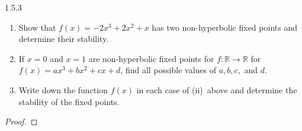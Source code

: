 \begin{problem}{1.5.3}
  \begin{enumerate}
    \item Show that $f(x) = -2x^3 + 2x^2 +x$ has two non-hyperbolic fixed points and determine their stability.
    \item If $x=0$ and $x=1$ are non-hyperbolic fixed points for $f:\mathbb{R}\to\mathbb{R}$ for $f(x) = ax^3 + bx^2 + cx + d$,
      find all possible values of $a, b, c,$ and $d$.
    \item Write down the function $f(x)$ in each case of (ii)\ above and determine the stability of the fixed points.
  \end{enumerate}
\end{problem}

\begin{proof}
\end{proof}
\newpage
